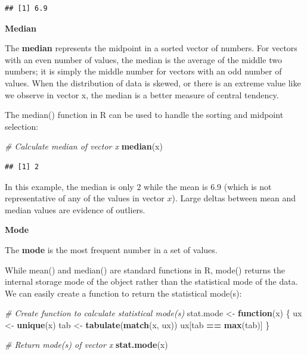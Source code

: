 \documentclass[]{book}
\newenvironment{Shaded}{\begin{snugshade}}{\end{snugshade}}
\newcommand{\CommentTok}[1]{\textcolor[rgb]{0.56,0.35,0.01}{\textit{#1}}}
\newcommand{\ControlFlowTok}[1]{\textcolor[rgb]{0.13,0.29,0.53}{\textbf{#1}}}
\newcommand{\KeywordTok}[1]{\textcolor[rgb]{0.13,0.29,0.53}{\textbf{#1}}}
\newcommand{\NormalTok}[1]{#1}
\newcommand{\OperatorTok}[1]{\textcolor[rgb]{0.81,0.36,0.00}{\textbf{#1}}}
\newcommand{\StringTok}[1]{\textcolor[rgb]{0.31,0.60,0.02}{#1}}
\begin{document}
\begin{verbatim}
## [1] 6.9
\end{verbatim}

\textbf{Median}

The \textbf{median} represents the midpoint in a sorted vector of numbers. For vectors with an even number of values, the median is the average of the middle two numbers; it is simply the middle number for vectors with an odd number of values. When the distribution of data is skewed, or there is an extreme value like we observe in vector x, the median is a better measure of central tendency.

The median() function in R can be used to handle the sorting and midpoint selection:

\begin{Shaded}
\begin{Highlighting}[]
\CommentTok{# Calculate median of vector x}
\KeywordTok{median}\NormalTok{(x)}
\end{Highlighting}
\end{Shaded}

\begin{verbatim}
## [1] 2
\end{verbatim}

In this example, the median is only 2 while the mean is 6.9 (which is not representative of any of the values in vector \(x\)). Large deltas between mean and median values are evidence of outliers.

\textbf{Mode}

The \textbf{mode} is the most frequent number in a set of values.

While mean() and median() are standard functions in R, mode() returns the internal storage mode of the object rather than the statistical mode of the data. We can easily create a function to return the statistical mode(s):

\begin{Shaded}
\begin{Highlighting}[]
\CommentTok{# Create function to calculate statistical mode(s)}
\NormalTok{stat.mode <-}\StringTok{ }\ControlFlowTok{function}\NormalTok{(x) \{}
\NormalTok{  ux <-}\StringTok{ }\KeywordTok{unique}\NormalTok{(x)}
\NormalTok{  tab <-}\StringTok{ }\KeywordTok{tabulate}\NormalTok{(}\KeywordTok{match}\NormalTok{(x, ux))}
\NormalTok{  ux[tab }\OperatorTok{==}\StringTok{ }\KeywordTok{max}\NormalTok{(tab)]}
\NormalTok{\}}

\CommentTok{# Return mode(s) of vector x}
\KeywordTok{stat.mode}\NormalTok{(x)}
\end{Highlighting}
\end{Shaded}
\end{document}
